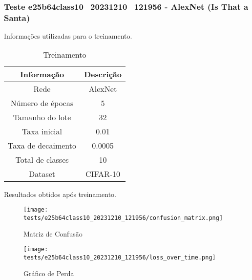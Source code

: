 \subsubsection{Teste e25b64class10_20231210_121956 - AlexNet (Is That a Santa)}

Informações utilizadas para o treinamento.

\begin{table}[ht]
   \centering
   \caption{Treinamento}
   \label{tab:modelos}
   \begin{tabular}{| c | c | }
      \hline 
      \textbf{Informação} & \textbf{Descrição} \\
      \hline \hline 
      Rede & AlexNet \\
      \hline
      Número de épocas & 5\\
      \hline
      Tamanho do lote & 32\\
      \hline
      Taxa inicial & 0.01 \\
      \hline
      Taxa de decaimento & 0.0005 \\
      \hline
      Total de classes & 10\\
      \hline
      Dataset & CIFAR-10\\
      \hline
   \end{tabular} 
\end{table}

Resultados obtidos após treinamento.


\begin{figure}[ht]
 \begin{center}
   \texttt{[image: tests/e25b64class10\_20231210\_121956/confusion\_matrix.png]}
  \caption{Matriz de Confusão}
  \label{fig:fig03}
 \end{center}
\end{figure}

\begin{figure}[ht]
 \begin{center}
   \texttt{[image: tests/e25b64class10\_20231210\_121956/loss\_over\_time.png]}
  \caption{Gráfico de Perda}
  \label{fig:fig04}
 \end{center}
\end{figure}
